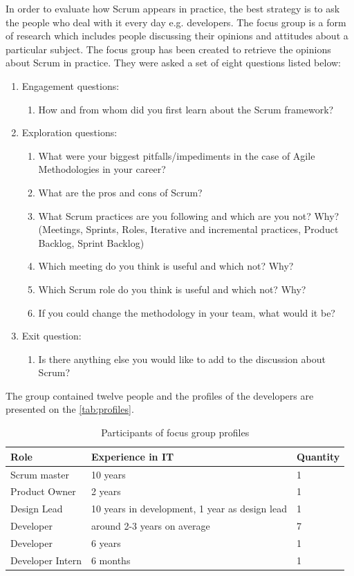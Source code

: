 In order to evaluate how Scrum appears in practice, the best strategy is to ask the people who deal with it every day e.g. developers. The focus group is a form of research which includes people discussing their opinions and attitudes about a particular subject. The focus group has been created to retrieve the opinions about Scrum in practice. They were asked a set of eight questions listed below:
\begin{enumerate}
    \item Engagement questions:
    \begin{enumerate}
        \item How and from whom did you first learn about the Scrum framework?
    \end{enumerate}
    \item Exploration questions:
    \begin{enumerate}
        \item What were your biggest pitfalls/impediments in the case of Agile Methodologies in your career?
        \item What are the pros and cons of Scrum?
        \item What Scrum practices are you following and which are you not? Why? (Meetings, Sprints, Roles, Iterative and incremental practices, Product Backlog, Sprint Backlog)
        \item Which meeting do you think is useful and which not? Why?
        \item Which Scrum role do you think is useful and which not? Why?
        \item If you could change the methodology in your team, what would it be?
    \end{enumerate}
    \item Exit question:
    \begin{enumerate}
        \item Is there anything else you would like to add to the discussion about Scrum?
    \end{enumerate}
\end{enumerate}

The group contained twelve people and the profiles of the developers are presented on the \autoref{tab:profiles}.

\begin{table}[ht!]
\caption{Participants of focus group profiles}
\label{tab:profiles}
\begin{tabularx}{\textwidth}{|X|X|X|}
\hline
\textbf{Role} & \textbf{Experience in IT} & \textbf{Quantity}  \\ \hline
Scrum master & 10 years & 1 \\ \hline
Product Owner & 2 years & 1 \\ \hline
Design Lead & 10 years in development, 1 year as design lead & 1 \\ \hline
Developer & around 2-3 years on average & 7 \\ \hline
Developer & 6 years & 1 \\ \hline
Developer Intern & 6 months & 1 \\ \hline
\end{tabularx}
\end{table}

